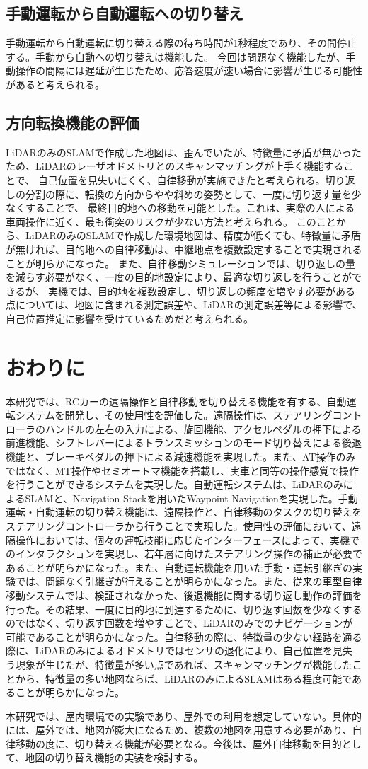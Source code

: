 \subsection{手動運転から自動運転への切り替え}
手動運転から自動運転に切り替える際の待ち時間が1秒程度であり、その間停止する。手動から自動への切り替えは機能した。
今回は問題なく機能したが、手動操作の間隔には遅延が生じたため、応答速度が速い場合に影響が生じる可能性があると考えられる。

\subsection{方向転換機能の評価}
LiDARのみのSLAMで作成した地図は、歪んでいたが、特徴量に矛盾が無かったため、LiDARのレーザオドメトリとのスキャンマッチングが上手く機能することで、
自己位置を見失いにくく、自律移動が実施できたと考えられる。切り返しの分割の際に、転換の方向からやや斜めの姿勢として、一度に切り返す量を少なくすることで、
最終目的地への移動を可能とした。これは、実際の人による車両操作に近く、最も衝突のリスクが少ない方法と考えられる。
このことから、LiDARのみのSLAMで作成した環境地図は、精度が低くても、特徴量に矛盾が無ければ、目的地への自律移動は、中継地点を複数設定することで実現されることが明らかになった。
また、自律移動シミュレーションでは、切り返しの量を減らす必要がなく、一度の目的地設定により、最適な切り返しを行うことができるが、
実機では、目的地を複数設定し、切り返しの頻度を増やす必要がある点については、地図に含まれる測定誤差や、LiDARの測定誤差等による影響で、
自己位置推定に影響を受けているためだと考えられる。

\section{おわりに}
本研究では、RCカーの遠隔操作と自律移動を切り替える機能を有する、自動運転システムを開発し、その使用性を評価した。遠隔操作は、ステアリングコントローラのハンドルの左右の入力による、旋回機能、アクセルペダルの押下による前進機能、シフトレバーによるトランスミッションのモード切り替えによる後退機能と、ブレーキペダルの押下による減速機能を実現した。また、AT操作のみではなく、MT操作やセミオートマ機能を搭載し、実車と同等の操作感覚で操作を行うことができるシステムを実現した。自動運転システムは、LiDARのみによるSLAMと、Navigation Stackを用いたWaypoint Navigationを実現した。手動運転・自動運転の切り替え機能は、遠隔操作と、自律移動のタスクの切り替えをステアリングコントローラから行うことで実現した。使用性の評価において、遠隔操作においては、個々の運転技能に応じたインターフェースによって、実機でのインタラクションを実現し、若年層に向けたステアリング操作の補正が必要であることが明らかになった。また、自動運転機能を用いた手動・運転引継ぎの実験では、問題なく引継ぎが行えることが明らかになった。また、従来の車型自律移動システムでは、検証されなかった、後退機能に関する切り返し動作の評価を行った。その結果、一度に目的地に到達するために、切り返す回数を少なくするのではなく、切り返す回数を増やすことで、LiDARのみでのナビゲーションが可能であることが明らかになった。自律移動の際に、特徴量の少ない経路を通る際に、LiDARのみによるオドメトリではセンサの退化により、自己位置を見失う現象が生じたが、特徴量が多い点であれば、スキャンマッチングが機能したことから、特徴量の多い地図ならば、LiDARのみによるSLAMはある程度可能であることが明らかになった。

本研究では、屋内環境での実験であり、屋外での利用を想定していない。具体的には、屋外では、地図が膨大になるため、複数の地図を用意する必要があり、自律移動の度に、切り替える機能が必要となる。今後は、屋外自律移動を目的として、地図の切り替え機能の実装を検討する。
